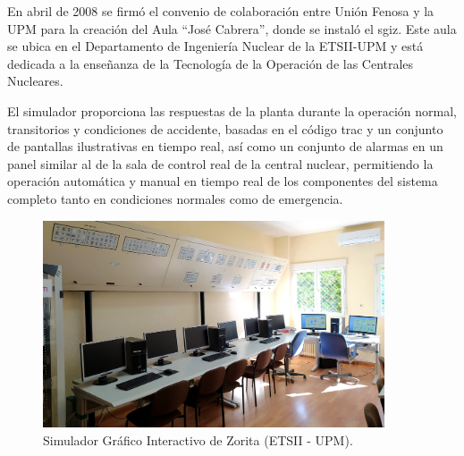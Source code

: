 En abril de 2008 se firmó el convenio de colaboración entre Unión Fenosa y la UPM para la creación del Aula ``José Cabrera'', donde se instaló el \acrshort{sgiz}. Este aula se ubica en el Departamento de Ingeniería Nuclear de la ETSII-UPM y está dedicada a la enseñanza de la Tecnología de la Operación de las Centrales Nucleares.

El simulador proporciona las respuestas de la planta durante la operación normal, transitorios y condiciones de accidente, basadas en el código \acrshort{trac} y un conjunto de pantallas ilustrativas en tiempo real, así como un conjunto de alarmas en un panel similar al de la sala de control real de la central nuclear, permitiendo la operación automática y manual en tiempo real de los componentes del sistema completo tanto en condiciones normales como de emergencia.

\begin{figure}[h]
  \centering
  \includegraphics[width=0.9\textwidth]{content/figures/sgiz.jpg}
  \caption{Simulador Gráfico Interactivo de Zorita (ETSII - UPM).}
  \label{fig:sgiz}
\end{figure}